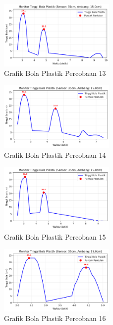 \begin{figure}[htbp]
    \centering
    \includegraphics[width=0.5\textwidth]{chapters/DataPercobaan/Grafik_Bola_Plastik_13.png}
    \caption{Grafik Bola Plastik Percobaan 13}
\end{figure}
\begin{figure}[htbp]
    \centering
    \includegraphics[width=0.5\textwidth]{chapters/DataPercobaan/Grafik_Bola_Plastik_14.png}
    \caption{Grafik Bola Plastik Percobaan 14}
\end{figure}
\begin{figure}[htbp]
    \centering
    \includegraphics[width=0.5\textwidth]{chapters/DataPercobaan/Grafik_Bola_Plastik_15.png}
    \caption{Grafik Bola Plastik Percobaan 15}
\end{figure}
\begin{figure}[htbp]
    \centering
    \includegraphics[width=0.5\textwidth]{chapters/DataPercobaan/Grafik_Bola_Plastik_16.png}
    \caption{Grafik Bola Plastik Percobaan 16}
\end{figure}
